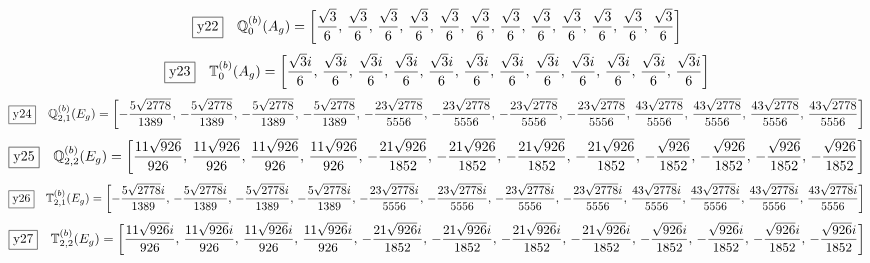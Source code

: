\documentclass[fleqn,10pt,landscape]{jsarticle}
\begin{document}
\begin{dmath*}
\fbox{y22}\quad \mathbb{Q}_{0}^{(b)}(A_{g})=\left[ \frac{\sqrt{3}}{6},\, \frac{\sqrt{3}}{6},\, \frac{\sqrt{3}}{6},\, \frac{\sqrt{3}}{6},\, \frac{\sqrt{3}}{6},\, \frac{\sqrt{3}}{6},\, \frac{\sqrt{3}}{6},\, \frac{\sqrt{3}}{6},\, \frac{\sqrt{3}}{6},\, \frac{\sqrt{3}}{6},\, \frac{\sqrt{3}}{6},\, \frac{\sqrt{3}}{6} \right]
\end{dmath*}
\begin{dmath*}
\fbox{y23}\quad \mathbb{T}_{0}^{(b)}(A_{g})=\left[ \frac{\sqrt{3} i}{6},\, \frac{\sqrt{3} i}{6},\, \frac{\sqrt{3} i}{6},\, \frac{\sqrt{3} i}{6},\, \frac{\sqrt{3} i}{6},\, \frac{\sqrt{3} i}{6},\, \frac{\sqrt{3} i}{6},\, \frac{\sqrt{3} i}{6},\, \frac{\sqrt{3} i}{6},\, \frac{\sqrt{3} i}{6},\, \frac{\sqrt{3} i}{6},\, \frac{\sqrt{3} i}{6} \right]
\end{dmath*}
\begin{dmath*}
\fbox{y24}\quad \mathbb{Q}_{2,1}^{(b)}(E_{g})=\left[ - \frac{5 \sqrt{2778}}{1389},\, - \frac{5 \sqrt{2778}}{1389},\, - \frac{5 \sqrt{2778}}{1389},\, - \frac{5 \sqrt{2778}}{1389},\, - \frac{23 \sqrt{2778}}{5556},\, - \frac{23 \sqrt{2778}}{5556},\, - \frac{23 \sqrt{2778}}{5556},\, - \frac{23 \sqrt{2778}}{5556},\, \frac{43 \sqrt{2778}}{5556},\, \frac{43 \sqrt{2778}}{5556},\, \frac{43 \sqrt{2778}}{5556},\, \frac{43 \sqrt{2778}}{5556} \right]
\end{dmath*}
\begin{dmath*}
\fbox{y25}\quad \mathbb{Q}_{2,2}^{(b)}(E_{g})=\left[ \frac{11 \sqrt{926}}{926},\, \frac{11 \sqrt{926}}{926},\, \frac{11 \sqrt{926}}{926},\, \frac{11 \sqrt{926}}{926},\, - \frac{21 \sqrt{926}}{1852},\, - \frac{21 \sqrt{926}}{1852},\, - \frac{21 \sqrt{926}}{1852},\, - \frac{21 \sqrt{926}}{1852},\, - \frac{\sqrt{926}}{1852},\, - \frac{\sqrt{926}}{1852},\, - \frac{\sqrt{926}}{1852},\, - \frac{\sqrt{926}}{1852} \right]
\end{dmath*}
\begin{dmath*}
\fbox{y26}\quad \mathbb{T}_{2,1}^{(b)}(E_{g})=\left[ - \frac{5 \sqrt{2778} i}{1389},\, - \frac{5 \sqrt{2778} i}{1389},\, - \frac{5 \sqrt{2778} i}{1389},\, - \frac{5 \sqrt{2778} i}{1389},\, - \frac{23 \sqrt{2778} i}{5556},\, - \frac{23 \sqrt{2778} i}{5556},\, - \frac{23 \sqrt{2778} i}{5556},\, - \frac{23 \sqrt{2778} i}{5556},\, \frac{43 \sqrt{2778} i}{5556},\, \frac{43 \sqrt{2778} i}{5556},\, \frac{43 \sqrt{2778} i}{5556},\, \frac{43 \sqrt{2778} i}{5556} \right]
\end{dmath*}
\begin{dmath*}
\fbox{y27}\quad \mathbb{T}_{2,2}^{(b)}(E_{g})=\left[ \frac{11 \sqrt{926} i}{926},\, \frac{11 \sqrt{926} i}{926},\, \frac{11 \sqrt{926} i}{926},\, \frac{11 \sqrt{926} i}{926},\, - \frac{21 \sqrt{926} i}{1852},\, - \frac{21 \sqrt{926} i}{1852},\, - \frac{21 \sqrt{926} i}{1852},\, - \frac{21 \sqrt{926} i}{1852},\, - \frac{\sqrt{926} i}{1852},\, - \frac{\sqrt{926} i}{1852},\, - \frac{\sqrt{926} i}{1852},\, - \frac{\sqrt{926} i}{1852} \right]
\end{dmath*}
\end{document}
